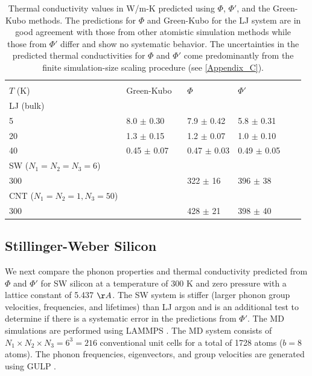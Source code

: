 \documentclass[12pt,twocolumn,iop]{/usr/share/texmf-texlive/tex/latex/iop/iopart}[/usr/share/texmf-texlive/tex/latex/iop/]
\begin{document}
\begin{center}
\begin{table}
\caption{\label{T:cond_table}Thermal conductivity values in W/m-K predicted using $\Phi$, $\Phi'$, and the Green-Kubo methods.  The predictions for $\Phi$ and Green-Kubo for the LJ system are in good agreement with those from other atomistic simulation methods\cite{turney2009a} while those from $\Phi'$ differ and show no systematic behavior. The uncertainties in the predicted thermal conductivities for $\Phi$ and $\Phi'$ come predominantly from the finite simulation-size scaling procedure (see \ref{Appendix_C}).}
\begin{ruledtabular}
\begin{tabular}{llllll}
     &                             &         &      &   \\
$T$ (K)&Green-Kubo \ &$\Phi$ &$\Phi'$\\
\hline
LJ (bulk)\\
5&8.0 $\pm$ 0.30 &7.9 $\pm$ 0.42 &5.8 $\pm$ 0.31 \\
20&1.3 $\pm$ 0.15 &1.2 $\pm$ 0.07 &1.0 $\pm$ 0.10 \\
40&0.45 $\pm$ 0.07 &0.47 $\pm$ 0.03 &0.49 $\pm$ 0.05 \\
\hline
SW ($N_1=N_2=N_3=6$) \\
300& &322 $\pm$ 16 &396 $\pm$ 38 \\
\hline
CNT ($N_1=N_2=1, N_3=50$) \\
300& &428 $\pm$ 21 &398 $\pm$ 40 \\
\end{tabular}
\end{ruledtabular}
\end{table}
\end{center}

\vspace*{10mm}

\subsection{\label{S:Subsection_prop_SW}Stillinger-Weber Silicon}

We next compare the phonon properties and thermal conductivity predicted from $\Phi$ and $\Phi'$ for SW silicon \cite{stillinger1985} at a temperature of $300$ K and zero pressure with a lattice constant of 5.437 $\AA$. The SW system is stiffer (larger phonon group velocities, frequencies, and lifetimes) than LJ argon and is an additional test to determine if there is a systematic error in the predictions from $\Phi'$. The MD simulations are performed using LAMMPS \cite{LAMMPS}. The MD system consists
of $N_1 \times N_2 \times N_3 = 6^3 = 216$ conventional unit cells for a total of 1728 atoms ($b=8$ atoms). The phonon frequencies, eigenvectors, and group velocities are generated using GULP \cite{GULP}.
\end{document}
